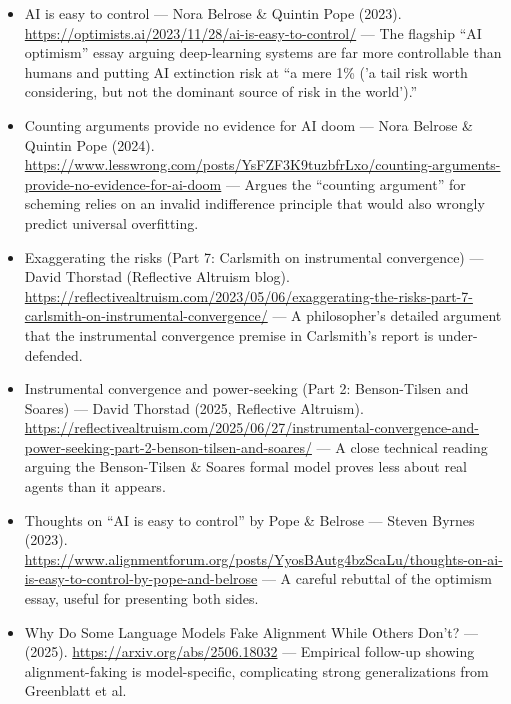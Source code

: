 \documentclass[11pt]{article}
\begin{document}
\begin{itemize}
  \item AI is easy to control --- Nora Belrose \& Quintin Pope (2023). \href{https://optimists.ai/2023/11/28/ai-is-easy-to-control/}{https://optimists.ai/2023/11/28/ai-is-easy-to-control/} --- The flagship ``AI optimism'' essay arguing deep-learning systems are far more controllable than humans and putting AI extinction risk at ``a mere 1\% ('a tail risk worth considering, but not the dominant source of risk in the world').''
  \item Counting arguments provide no evidence for AI doom --- Nora Belrose \& Quintin Pope (2024). \href{https://www.lesswrong.com/posts/YsFZF3K9tuzbfrLxo/counting-arguments-provide-no-evidence-for-ai-doom}{https://www.lesswrong.com/posts/YsFZF3K9tuzbfrLxo/counting-arguments-provide-no-evidence-for-ai-doom} --- Argues the ``counting argument'' for scheming relies on an invalid indifference principle that would also wrongly predict universal overfitting.
  \item Exaggerating the risks (Part 7: Carlsmith on instrumental convergence) --- David Thorstad (Reflective Altruism blog). \href{https://reflectivealtruism.com/2023/05/06/exaggerating-the-risks-part-7-carlsmith-on-instrumental-convergence/}{https://reflectivealtruism.com/2023/05/06/exaggerating-the-risks-part-7-carlsmith-on-instrumental-convergence/} --- A philosopher's detailed argument that the instrumental convergence premise in Carlsmith's report is under-defended.
  \item Instrumental convergence and power-seeking (Part 2: Benson-Tilsen and Soares) --- David Thorstad (2025, Reflective Altruism). \href{https://reflectivealtruism.com/2025/06/27/instrumental-convergence-and-power-seeking-part-2-benson-tilsen-and-soares/}{https://reflectivealtruism.com/2025/06/27/instrumental-convergence-and-power-seeking-part-2-benson-tilsen-and-soares/} --- A close technical reading arguing the Benson-Tilsen \& Soares formal model proves less about real agents than it appears.
  \item Thoughts on ``AI is easy to control'' by Pope \& Belrose --- Steven Byrnes (2023). \href{https://www.alignmentforum.org/posts/YyosBAutg4bzScaLu/thoughts-on-ai-is-easy-to-control-by-pope-and-belrose}{https://www.alignmentforum.org/posts/YyosBAutg4bzScaLu/thoughts-on-ai-is-easy-to-control-by-pope-and-belrose} --- A careful rebuttal of the optimism essay, useful for presenting both sides.
  \item Why Do Some Language Models Fake Alignment While Others Don't? --- (2025). \href{https://arxiv.org/abs/2506.18032}{https://arxiv.org/abs/2506.18032} --- Empirical follow-up showing alignment-faking is model-specific, complicating strong generalizations from Greenblatt et al.
\end{itemize}



\end{document}
